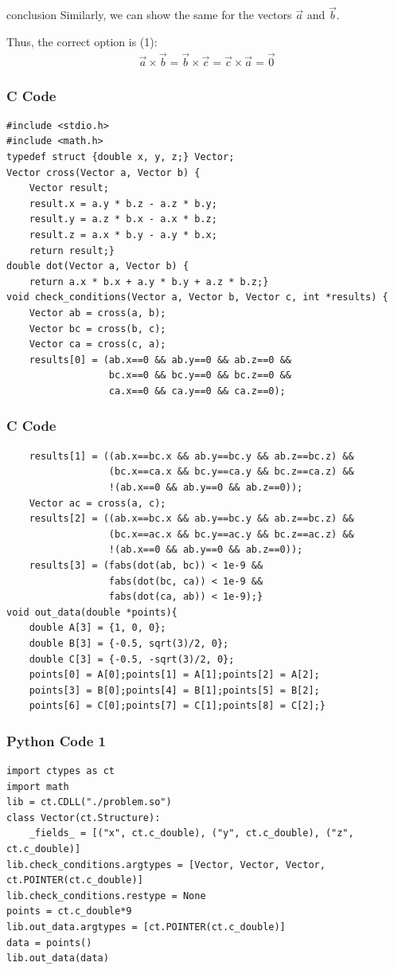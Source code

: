 \documentclass{beamer}
\begin{document}
\begin{frame}{conclusion}
Similarly, we can show the same for the vectors $\vec{a}$ and $\vec{b}$.

Thus, the correct option is (1):
\begin{align}
    \vec{a}\times \vec{b}=\vec{b}\times \vec{c}=\vec{c}\times \vec{a}=\vec{0}
\end{align}
\end{frame}


\begin{frame}[fragile]
    \frametitle{C Code}
    \begin{lstlisting}
#include <stdio.h>
#include <math.h>
typedef struct {double x, y, z;} Vector;
Vector cross(Vector a, Vector b) {
    Vector result;
    result.x = a.y * b.z - a.z * b.y;
    result.y = a.z * b.x - a.x * b.z;
    result.z = a.x * b.y - a.y * b.x;
    return result;}
double dot(Vector a, Vector b) {
    return a.x * b.x + a.y * b.y + a.z * b.z;}
void check_conditions(Vector a, Vector b, Vector c, int *results) {
    Vector ab = cross(a, b);
    Vector bc = cross(b, c);
    Vector ca = cross(c, a);
    results[0] = (ab.x==0 && ab.y==0 && ab.z==0 &&
                  bc.x==0 && bc.y==0 && bc.z==0 &&
                  ca.x==0 && ca.y==0 && ca.z==0);
    \end{lstlisting}
\end{frame}

\begin{frame}[fragile]
    \frametitle{C Code}
    \begin{lstlisting}
    results[1] = ((ab.x==bc.x && ab.y==bc.y && ab.z==bc.z) &&
                  (bc.x==ca.x && bc.y==ca.y && bc.z==ca.z) &&
                  !(ab.x==0 && ab.y==0 && ab.z==0));
    Vector ac = cross(a, c);
    results[2] = ((ab.x==bc.x && ab.y==bc.y && ab.z==bc.z) &&
                  (bc.x==ac.x && bc.y==ac.y && bc.z==ac.z) &&
                  !(ab.x==0 && ab.y==0 && ab.z==0));
    results[3] = (fabs(dot(ab, bc)) < 1e-9 &&
                  fabs(dot(bc, ca)) < 1e-9 &&
                  fabs(dot(ca, ab)) < 1e-9);}
void out_data(double *points){
    double A[3] = {1, 0, 0};
    double B[3] = {-0.5, sqrt(3)/2, 0};
    double C[3] = {-0.5, -sqrt(3)/2, 0};
    points[0] = A[0];points[1] = A[1];points[2] = A[2];
    points[3] = B[0];points[4] = B[1];points[5] = B[2];
    points[6] = C[0];points[7] = C[1];points[8] = C[2];}
    \end{lstlisting}
\end{frame}

\begin{frame}[fragile]
    \frametitle{Python Code 1}
    \begin{lstlisting}
import ctypes as ct
import math
lib = ct.CDLL("./problem.so")
class Vector(ct.Structure):
    _fields_ = [("x", ct.c_double), ("y", ct.c_double), ("z", ct.c_double)]
lib.check_conditions.argtypes = [Vector, Vector, Vector, ct.POINTER(ct.c_double)]
lib.check_conditions.restype = None
points = ct.c_double*9
lib.out_data.argtypes = [ct.POINTER(ct.c_double)]
data = points()
lib.out_data(data)
    \end{lstlisting}
\end{frame}
\end{document}
